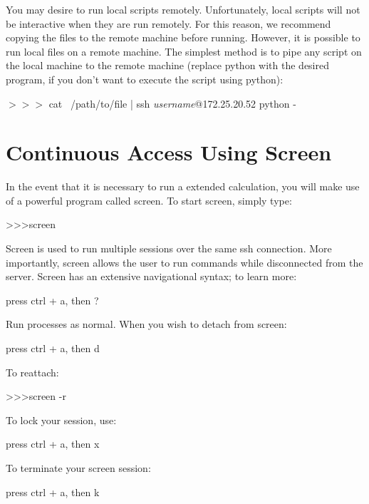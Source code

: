 You may desire to run local scripts remotely. Unfortunately, local scripts will not be interactive when they are run remotely. For this reason, we recommend copying the files to the remote machine before running. However, it is possible to run local files on a remote machine. The simplest method is to pipe any script on the local machine to the remote machine (replace python with the desired program, if you don't want to execute the script using python):

\begin{mdframed}
$>>>$ \quad cat ~/path/to/file | ssh \textit{username}@172.25.20.52 python -
\end{mdframed}

\section{Continuous Access Using Screen}
In the event that it is necessary to run a extended calculation, you will make use of a powerful program called screen. To start screen, simply type:

\begin{mdframed}
\textgreater\textgreater\textgreater \quad screen
\end{mdframed}

Screen is used to run multiple sessions over the same ssh connection. More importantly, screen allows the user to run commands while disconnected from the server. Screen has an extensive navigational syntax; to learn more:

\begin{mdframed}
press ctrl + a, then ?
\end{mdframed}

Run processes as normal. When you wish to detach from screen:

\begin{mdframed}
press ctrl + a, then d
\end{mdframed}

To reattach:

\begin{mdframed}
\textgreater\textgreater\textgreater \quad screen -r
\end{mdframed}

To lock your session, use:

\begin{mdframed}
press ctrl + a, then x
\end{mdframed}

To terminate your screen session:
\begin{mdframed}
press ctrl + a, then k
\end{mdframed}

